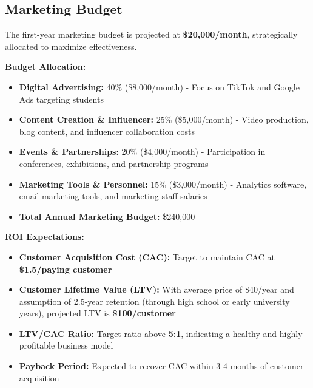 \subsection{Marketing Budget}
The first-year marketing budget is projected at \textbf{\$20,000/month}, strategically allocated to maximize effectiveness.

\textbf{Budget Allocation:}
\begin{itemize}
    \item \textbf{Digital Advertising:} 40\% (\$8,000/month) - Focus on TikTok and Google Ads targeting students
    \item \textbf{Content Creation \& Influencer:} 25\% (\$5,000/month) - Video production, blog content, and influencer collaboration costs
    \item \textbf{Events \& Partnerships:} 20\% (\$4,000/month) - Participation in conferences, exhibitions, and partnership programs
    \item \textbf{Marketing Tools \& Personnel:} 15\% (\$3,000/month) - Analytics software, email marketing tools, and marketing staff salaries
    \item \textbf{Total Annual Marketing Budget:} \$240,000
\end{itemize}

\textbf{ROI Expectations:}
\begin{itemize}
    \item \textbf{Customer Acquisition Cost (CAC):} Target to maintain CAC at \textbf{\$1.5/paying customer}
    \item \textbf{Customer Lifetime Value (LTV):} With average price of \$40/year and assumption of 2.5-year retention (through high school or early university years), projected LTV is \textbf{\$100/customer}
    \item \textbf{LTV/CAC Ratio:} Target ratio above \textbf{5:1}, indicating a healthy and highly profitable business model
    \item \textbf{Payback Period:} Expected to recover CAC within 3-4 months of customer acquisition
\end{itemize}